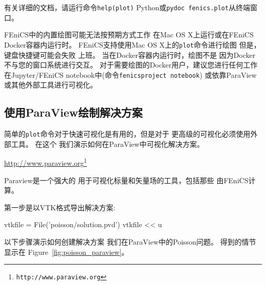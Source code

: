 有关详细的文档，请运行命令\texttt{help(plot)}
Python或\texttt{pydoc fenics.plot}从终端窗口。

\begin{notice}
FEniCS中的内置绘图可能无法按预期方式工作
在Mac OS X上运行或在FEniCS Docker容器内运行时。
FEniCS支持使用Mac OS X上的\texttt{plot}命令进行绘图
但是，键盘快捷键可能会失败
上班。 当在Docker容器内运行时，绘图不是
因为Docker不与您的窗口系统进行交互。
对于需要绘图的Docker用户，建议您进行任何工作
在Jupyter/FEniCS notebook中(命令\texttt{fenicsproject notebook})
或依靠ParaView或其他外部工具进行可视化。
\end{notice}

\subsection{使用ParaView绘制解决方案}


简单的\texttt{plot}命令对于快速可视化是有用的，但是对于
更高级的可视化必须使用外部工具。 在这个
我们演示如何在ParaView中可视化解决方案。
\begin{center}
  \url{http://www.paraview.org}\footnote{\texttt{http://www.paraview.org}}
\end{center}
Paraview是一个强大的
用于可视化标量和矢量场的工具，包括那些
由FEniCS计算。

第一步是以VTK格式导出解决方案:

\begin{python}
vtkfile = File('poisson/solution.pvd')
vtkfile << u
\end{python}

以下步骤演示如何创建解决方案
我们在ParaView中的Poisson问题。 得到的情节显示在
Figure~\ref{fig:poisson_paraview}。

